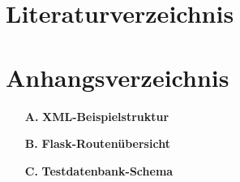 \documentclass[
pagesize,				%
a4paper,				%
oneside,				%
headsepline,		    %
11pt,					%
halfparskip,		    %
final,					%
listof=totoc           %
]{scrartcl}			    %
\begin{document}




\newpage
\renewcommand{\thesection}{\roman{section}}
\ohead[\pagemark]{}
\setcounter{section}{0}
\newpage
\section{Literaturverzeichnis}
\label{sec:literaturverzeichnis}
\printbibliography
\newpage
\section{Anhangsverzeichnis}
\label{sec:anhangsverzeichnis}

\begin{itemize}
  \item[\textbf{A.}] \textbf{XML-Beispielstruktur} \label{anh:xml}
  \item[\textbf{B.}] \textbf{Flask-Routenübersicht} \label{anh:flask}
  \item[\textbf{C.}] \textbf{Testdatenbank-Schema} \label{anh:db}
\end{itemize}

\newpage

\end{document}
